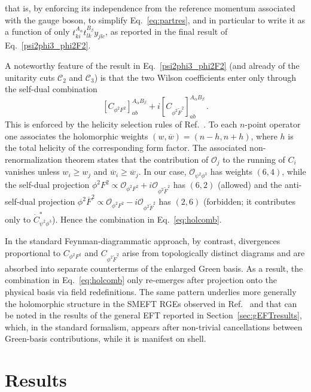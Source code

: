 that is, by enforcing its independence from the reference momentum associated with the gauge
boson, to simplify Eq.~\eqref{eq:partres}, and in particular to write it as a function of only
$t^{A_\alpha}_{ki}t^{B_\beta}_{lk}y_{jlc}$, as reported in the final result of
Eq.~\eqref{psi2phi3_phi2F2}.

A noteworthy feature of the result in Eq.~\eqref{psi2phi3_phi2F2} (and already of the unitarity
cuts $\mathcal C_2$ and $\mathcal C_3$) is that the two Wilson coefficients enter only through
the self-dual combination
\begin{equation}\label{eq:holcomb}
    \left[C_{\phi^2 F^2}\right]^{A_\alpha B_\beta}_{ab}
    + i \left[C_{\phi^2 \widetilde F^2}\right]^{A_\alpha B_\beta}_{ab}\,.
\end{equation}
This is enforced by the helicity selection rules of Ref.~\cite{Cheung:2015aba}.
To each $n$-point operator one associates the holomorphic weights $(w,\overline w)=(n-h,n+h)$,
where $h$ is the total helicity of the corresponding form factor.
The associated non-renormalization theorem states that the contribution of $\mathcal O_j$ to the
running of $C_i$ vanishes unless $w_i\geq w_j$ and $\overline w_i\geq\overline w_j$.
In our case, $\mathcal O_{\psi^2\phi^3}$ has weights $(6,4)$, while the self-dual projection
$\phi^2 F^2\propto\mathcal O_{\phi^2 F^2}+i\mathcal O_{\phi^2\widetilde F^2}$ has $(6,2)$
(allowed) and the anti-self-dual projection
$\phi^2 \overline F^2  \propto\mathcal O_{\phi^2 F^2}-i\mathcal O_{\phi^2\widetilde F^2}$
has $(2,6)$ (forbidden; it contributes only to $\dot C^*_{\psi^2\phi^3}$).
Hence the combination in Eq.~\eqref{eq:holcomb}.

In the standard Feynman-diagrammatic approach, by contrast, divergences proportional to
$C_{\phi^2 F^2}$ and $C_{\phi^2\widetilde F^2}$ arise from topologically distinct diagrams and
are absorbed into separate counterterms of the enlarged Green basis.
As a result, the combination in Eq.~\eqref{eq:holcomb} only re-emerges after projection onto the
physical basis via field redefinitions.
The same pattern underlies more generally the holomorphic structure in the SMEFT RGEs observed
in Ref.~\cite{Alonso:2014rga} and that can be noted in the results of the general EFT reported in Section~\ref{sec:gEFTresults}, which, in the standard formalism, appears after non-trivial
cancellations between Green-basis contributions, while it is manifest on shell.



\section{Results\label{sec:gEFTresults}}


